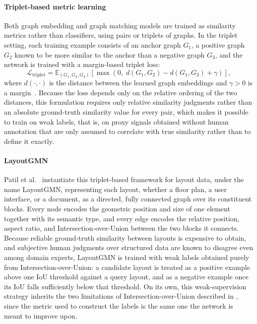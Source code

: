 \paragraph{Triplet-based metric learning}
Both graph embedding and graph matching models are trained as similarity metrics rather than classifiers, using pairs or triplets of graphs. In the triplet setting, each training example consists of an anchor graph $G_1$, a positive graph $G_2$ known to be more similar to the anchor than a negative graph $G_3$, and the network is trained with a margin-based triplet loss:
\[
\mathcal{L}_{\text{triplet}} = \mathbb{E}_{(G_1,G_2,G_3)}\left[\max\left(0,\; d(G_1,G_2) - d(G_1,G_3) + \gamma\right)\right],
\]
where $d(\cdot,\cdot)$ is the distance between the learned graph embeddings and $\gamma>0$ is a margin~\cite{li-gmn-2019}. Because the loss depends only on the relative ordering of the two distances, this formulation requires only relative similarity judgments rather than an absolute ground-truth similarity value for every pair, which makes it possible to train on weak labels, that is, on proxy signals obtained without human annotation that are only assumed to correlate with true similarity rather than to define it exactly.

\paragraph{LayoutGMN} 
Patil et al.~\cite{patil_layoutgmn_2021} instantiate this triplet-based framework for layout data, under the name LayoutGMN, representing each layout, whether a floor plan, a user interface, or a document, as a directed, fully connected graph over its constituent blocks. Every node encodes the geometric position and size of one element together with its semantic type, and every edge encodes the relative position, aspect ratio, and Intersection-over-Union between the two blocks it connects. Because reliable ground-truth similarity between layouts is expensive to obtain, and subjective human judgments over structured data are known to disagree even among domain experts, LayoutGMN is trained with weak labels obtained purely from Intersection-over-Union: a candidate layout is treated as a positive example above one IoU threshold against a query layout, and as a negative example once its IoU falls sufficiently below that threshold. On its own, this weak-supervision strategy inherits the two limitations of Intersection-over-Union described in , since the metric used to construct the labels is the same one the network is meant to improve upon.

